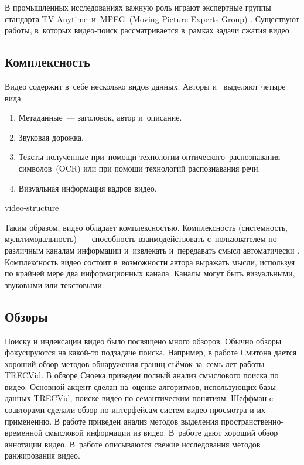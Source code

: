 В промышленных исследованиях важную роль играют экспертные группы
стандарта TV-Anytime\ и~MPEG~(Moving
Picture Experts Group) \cite{Pereira:2008}.
Существуют работы, в~которых видео-поиск рассматривается
в~рамках задачи сжатия видео \cite{Babu:2007}.


\subsection{Комплексность}

Видео содержит в~себе несколько видов данных.
Авторы \cite{Chung:2007:PAU} и~\cite{smeaton:2006} выделяют четыре вида.
\begin{enumerate}
    \item   Метаданные~— заголовок, автор и~описание.
    \item   Звуковая дорожка.
    \item   Тексты полученные при~помощи технологии
            оптического\
            распознавания символов\
            (OCR) или при помощи технологий
            распознавания речи\index{Распознавание!речи}.
    \item   Визуальная информация кадров видео.
\end{enumerate}


\begin{figuredt}
    {video-structure}
\end{figuredt}

Таким образом, видео обладает комплексностью.
Комплексность (системность, мультимодальность)~— способность взаимодействовать
с~пользователем по различным каналам информации
и~извлекать и~передавать смысл автоматически \cite{Nigay:1993}.
Комплексность видео состоит в~возможности автора выражать мысли,
используя по крайней мере два информационных канала.
Каналы могут быть визуальными, звуковыми или текстовыми.


\subsection{Обзоры}

Поиску и индексации видео было посвящено много обзоров.
Обычно обзоры фокусируются на какой-то подзадаче поиска.
Например, в работе Смитона \cite{Smeaton:2010} дается хороший обзор
методов обнаружения границ съёмок за~семь лет работы TRECVid.
В обзоре Сноека \cite{Snoek:2009} приведен
полный анализ смыслового поиска по видео.
Основной акцент сделан на~оценке алгоритмов,
использующих базы данных TRECVid,
поиске видео по семантическим понятиям.
Шеффман c соавторами \cite{Schoeffmann:2010} сделали
обзор по интерфейсам систем видео просмотра и их применению.
В работе \cite{Ren:2009} приведен анализ методов
выделения пространственно-временной смысловой информации из видео.
В~работе \cite{Zhang:2012} дают хороший обзор аннотации видео.
В~работе \cite{XinmieTian:2011} описываются свежие исследования
методов ранжирования видео.



